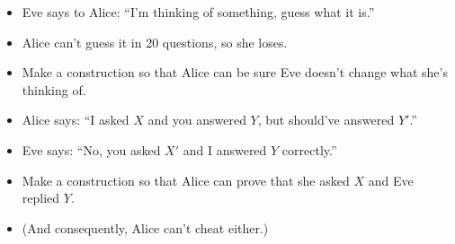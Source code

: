 \begin{frame}
  \begin{exercise}
    \begin{itemize}
      \item Eve says to Alice: \enquote{I'm thinking of something, guess what 
        it is.}
      \item Alice can't guess it in 20 questions, so she loses.
      \item Make a construction so that Alice can be sure Eve doesn't change 
        what she's thinking of.
    \end{itemize}
  \end{exercise}

  \begin{exercise}
    \begin{itemize}
      \item Alice says: \enquote{I asked \(X\) and you answered \(Y\),
        but should've answered \(Y'\).}
      \item Eve says: \enquote{No, you asked \(X'\) and I answered \(Y\) 
        correctly.}
      \item Make a construction so that Alice can prove that she asked \(X\) 
        and Eve replied \(Y\).
      \item (And consequently, Alice can't cheat either.)
    \end{itemize}
  \end{exercise}
\end{frame}

